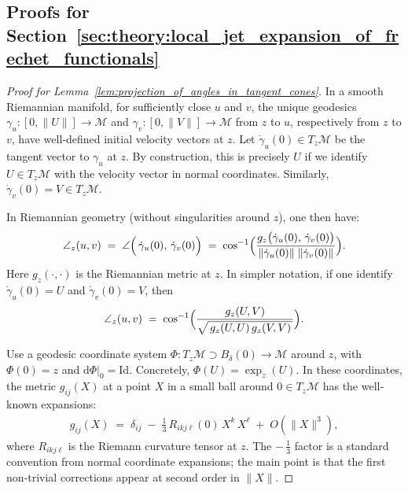 \clearpage
\subsection{Proofs for Section~\ref{sec:theory:local_jet_expansion_of_frechet_functionals}}

\begin{proof}[Proof for Lemma~\ref{lem:projection_of_angles_in_tangent_cones}]
    In a smooth Riemannian manifold, for sufficiently close \(u\) and \(v\), the unique geodesics \(\gamma_u \colon [0,\|U\|]\to \mathcal{M}\) and \(\gamma_v : [0,\|V\|]\to \mathcal{M}\) from \(z\) to \(u\), respectively from \(z\) to \(v\), have well‐defined initial velocity vectors at \(z\).  
    Let \(\dot{\gamma}_u(0)\in T_z\mathcal{M}\) be the tangent vector to \(\gamma_u\) at \(z\).
    By construction, this is precisely \(U\) if we identify \(U\in T_z\mathcal{M}\) with the velocity vector in normal coordinates.
    Similarly, \(\dot{\gamma}_v(0)=V\in T_z\mathcal{M}\).  

    In Riemannian geometry (without singularities around \(z\)), one then have:
    \begin{align*}
        \angle_z(u,v)
        \;=\;
        \angle\Bigl(\,\dot{\gamma}_u(0),\,\dot{\gamma}_v(0)\Bigr)
        \;=\;
        \cos^{-1}\Bigl(\frac{g_z\bigl(\dot{\gamma}_u(0),\,\dot{\gamma}_v(0)\bigr)}
                                 {\|\dot{\gamma}_u(0)\|\;\|\dot{\gamma}_v(0)\|}\Bigr).
    \end{align*}
    Here \(g_z(\cdot,\cdot)\) is the Riemannian metric at \(z\).
    In simpler notation, if one identify \(\dot{\gamma}_u(0)=U\) and \(\dot{\gamma}_v(0)=V\), then
    \begin{align*}
        \angle_z(u,v)
        \;=\;
        \cos^{-1}\Bigl(
         \frac{g_z(U,V)}
              {\sqrt{\,g_z(U,U)\,g_z(V,V)\,}}
        \Bigr).
    \end{align*}
    
    Use a geodesic coordinate system \(\Phi\colon T_z\mathcal{M} \supset B_{\delta}(0)\to \mathcal{M}\) around \(z\), with \(\Phi(0)=z\) and \(\mathrm{d}\Phi|_0 = \mathrm{Id}\).
    Concretely, \(\Phi(U) = \exp_z(U)\).  
    In these coordinates, the metric \(g_{ij}(X)\) at a point \(X\) in a small ball around \(0\in T_z\mathcal{M}\) has the well‐known expansions:
    \begin{align*}
        g_{ij}(X) 
          \;=\;
          \delta_{ij} 
          \;-\;
          \tfrac13\,R_{ikj\ell}(0)\,X^k\,X^\ell
          \;+\;
          O(\|X\|^3),
    \end{align*}
    where \(R_{ikj\ell}\) is the Riemann curvature tensor at \(z\).
    The \(-\,\tfrac13\) factor is a standard convention from normal coordinate expansions; the main point is that the first non‐trivial corrections appear at second order in \(\|X\|\).  


\end{proof}
